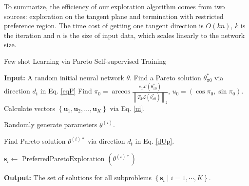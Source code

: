 \documentclass[final]{cvpr}
\begin{document}
To summarize, the efficiency of our exploration algorithm comes from two sources: exploration on the tangent plane and termination with restricted preference region.  
The time cost of getting one tangent direction is $O(kn)$, $k$ is the iteration and $n$ is the size of input data, which scales linearly to the network size.  




\begin{algorithm}[t]
	\caption{Few shot Learning via Pareto Self-supervised Training}
	\begin{algorithmic}[1]
			\State \textbf{Input:} A random initial neural network $\theta$.   
			\State Find a Pareto solution $\theta_{\pi0}^*$ via direction $d_t$ in Eq. \ref{eqP}
			\State Find $ \pi_0 = \arccos\frac{e_{1} \mathcal{L}(\theta_{\pi0}^*)}{\left \| T_2 \mathcal{L}(\theta_{\pi0}^*)\right \|_2}$, $u_0 = \left(\cos \pi_{0}, \sin \pi_{0} \right)$. 
			\State Calculate vectors $\left\{\boldsymbol{u}_{1}, \boldsymbol{u}_{2}, \ldots, \boldsymbol{u}_{K}\right\}$ via Eq. \ref{ui}.
		
			\State Randomly generate parameters $\theta^{(i)}$.
			
			\State Find Pareto solution $\theta^{(i)*}$ via direction $d_t$ in Eq. \ref{dUp}.

			
			\State $\boldsymbol{s}_{i} \leftarrow \text { PreferredParetoExploration }\left(\theta^{(i)*}\right)$
			
			
			\EndFor
			
			\State \textbf{Output:} The set of solutions for all subproblems $\left\{\boldsymbol{s}_{i} \mid i=1, \cdots, K\right\}$.
	\end{algorithmic}\label{a1} 
\end{algorithm}

 
\end{document}
